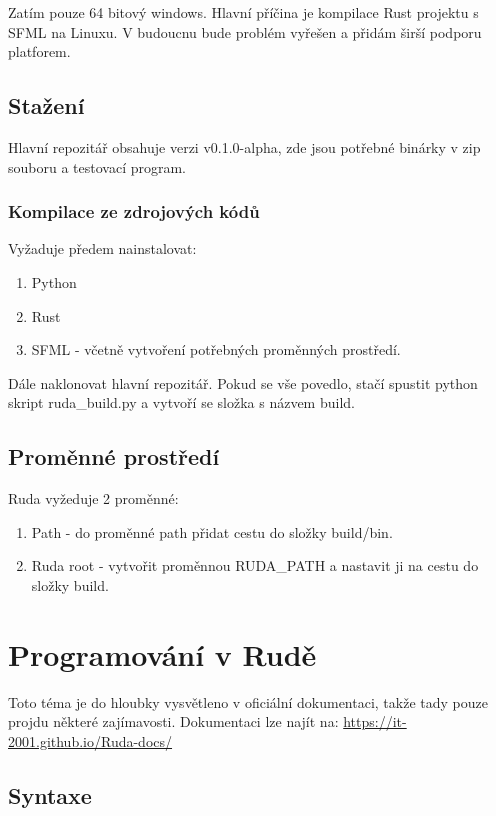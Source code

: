 \documentclass[12pt, a4paper,
twoside,        %
openright
]{report}
\let\oldchapter\chapter
\renewcommand{\chapter}{
	\clearpage
	\pagestyle{fancy}
	\oldchapter
}
\begin{document}
Zatím pouze 64 bitový windows. Hlavní příčina je kompilace Rust projektu s SFML na Linuxu. V budoucnu bude problém vyřešen a přidám širší podporu platforem.

\section{Stažení}

Hlavní repozitář obsahuje verzi v0.1.0-alpha, zde jsou potřebné binárky v zip souboru a testovací program.

\subsection{Kompilace ze zdrojových kódů}

Vyžaduje předem nainstalovat:

\begin{enumerate}
	\item Python
	\item Rust
	\item SFML - včetně vytvoření potřebných proměnných prostředí.
\end{enumerate}

Dále naklonovat hlavní repozitář. Pokud se vše povedlo, stačí spustit python skript ruda\_build.py a vytvoří se složka s názvem build.

\section{Proměnné prostředí}

Ruda vyžeduje 2 proměnné:

\begin{enumerate}
	\item Path - do proměnné path přidat cestu do složky build/bin.
	\item Ruda root - vytvořit proměnnou RUDA\_PATH a nastavit ji na cestu do složky build.
\end{enumerate}

\chapter{Programování v Rudě}

Toto téma je do hloubky vysvětleno v oficiální dokumentaci, takže tady pouze projdu některé zajímavosti. Dokumentaci lze najít na: \url{https://it-2001.github.io/Ruda-docs/}

\section{Syntaxe}
\end{document}
